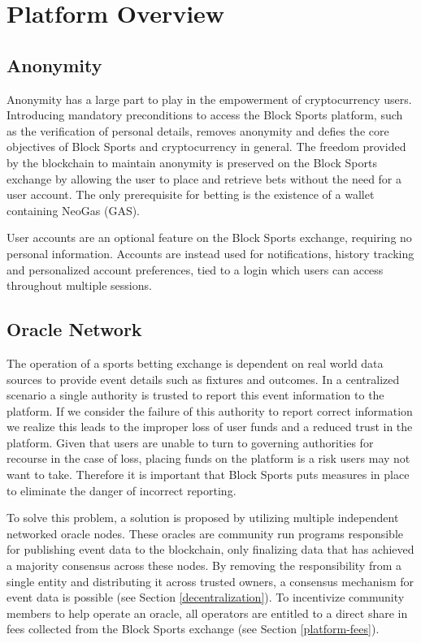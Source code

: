 \documentclass{article}
\begin{document}
\section{Platform Overview} \label{platform-overview}

	\subsection{Anonymity} \label{anonymity}
Anonymity has a large part to play in the empowerment of cryptocurrency users. Introducing mandatory preconditions to access the Block Sports platform, such as the verification of personal details, removes anonymity and defies the core objectives of Block Sports and cryptocurrency in general. The freedom provided by the blockchain to maintain anonymity is preserved on the Block Sports exchange by allowing the user to place and retrieve bets without the need for a user account. The only prerequisite for betting is the existence of a wallet containing NeoGas (GAS).

User accounts are an optional feature on the Block Sports exchange, requiring no personal information. Accounts are instead used for notifications, history tracking and personalized account preferences, tied to a login which users can access throughout multiple sessions.

	\subsection{Oracle Network} \label{oracle-network}
The operation of a sports betting exchange is dependent on real world data sources to provide event details such as fixtures and outcomes. In a centralized scenario a single authority is trusted to report this event information to the platform. If we consider the failure of this authority to report correct information we realize this leads to the improper loss of user funds and a reduced trust in the platform. Given that users are unable to turn to governing authorities for recourse in the case of loss, placing funds on the platform is a risk users may not want to take. Therefore it is important that Block Sports puts measures in place to eliminate the danger of incorrect reporting.

To solve this problem, a solution is proposed by utilizing multiple independent networked oracle nodes. These oracles are community run programs responsible for publishing event data to the blockchain, only finalizing data that has achieved a majority consensus across these nodes. By removing the responsibility from a single entity and distributing it across trusted owners, a consensus mechanism for event data is possible (see Section \ref{decentralization}). To incentivize community members to help operate an oracle, all operators are entitled to a direct share in fees collected from the Block Sports exchange (see Section \ref{platform-fees}).
\end{document}
